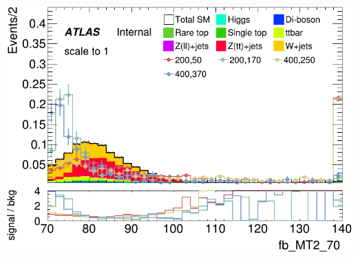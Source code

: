 \documentclass[usenames,dvipsnames]{beamer}
\begin{document}
\begin{frame}
\begin{minipage}{0.32\textwidth}
        \includegraphics[width=\textwidth]{graphics/HH_met_sig/HH_fb_MT2_70_norm.png}
    \end{minipage}
    
    \vspace{0.5cm}


\end{frame}
\end{document}
